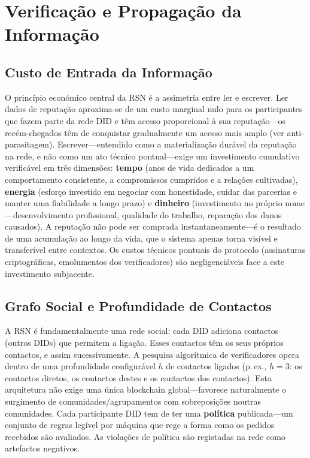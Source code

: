 \documentclass[11pt,a4paper,twocolumn]{article}
\begin{document}
\section{Verificação e Propagação da Informação}

\subsection{Custo de Entrada da Informação}

O princípio económico central da RSN é a assimetria entre ler e escrever. Ler dados de reputação aproxima-se de um custo marginal nulo para os participantes que fazem parte da rede DID e têm acesso proporcional à sua reputação---os recém-chegados têm de conquistar gradualmente um acesso mais amplo (ver anti-parasitagem). Escrever---entendido como a materialização durável da reputação na rede, e não como um ato técnico pontual---exige um investimento cumulativo verificável em três dimensões: \textbf{tempo} (anos de vida dedicados a um comportamento consistente, a compromissos cumpridos e a relações cultivadas), \textbf{energia} (esforço investido em negociar com honestidade, cuidar das parcerias e manter uma fiabilidade a longo prazo) e \textbf{dinheiro} (investimento no próprio nome---desenvolvimento profissional, qualidade do trabalho, reparação dos danos causados). A reputação não pode ser comprada instantaneamente---é o resultado de uma acumulação ao longo da vida, que o sistema apenas torna visível e transferível entre contextos. Os custos técnicos pontuais do protocolo (assinaturas criptográficas, emolumentos dos verificadores) são negligenciáveis face a este investimento subjacente.

\subsection{Grafo Social e Profundidade de Contactos}

A RSN é fundamentalmente uma rede social: cada DID adiciona contactos (outros DIDs) que permitem a ligação. Esses contactos têm os seus próprios contactos, e assim sucessivamente. A pesquisa algorítmica de verificadores opera dentro de uma profundidade configurável $h$ de contactos ligados (p.\,ex., $h=3$: os contactos diretos, os contactos destes e os contactos dos contactos). Esta arquitetura não exige uma única blockchain global---favorece naturalmente o surgimento de comunidades/agrupamentos com sobreposições noutras comunidades. Cada participante DID tem de ter uma \textbf{política} publicada---um conjunto de regras legível por máquina que rege a forma como os pedidos recebidos são avaliados. As violações de política são registadas na rede como artefactos negativos.
\end{document}
